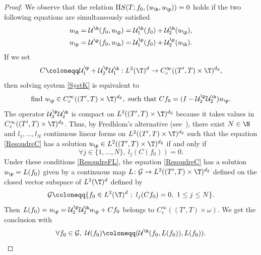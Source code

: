 \Changel
\begin{proof}

We observe that the relation $\Pi S(T;f_0, (u_{\h},u_{\p})) = 0$ holds
if the two following equations are simultaneously satisfied
\begin{equation}
\begin{split}
\label{SystK}
u_{\h} & = \mathcal U^\h(f_0, u_{\p}) = \mathcal U^\h_{1}(f_0) + \mathcal U^\h_{2}(u_{\p}),\\
u_{\p} & = \mathcal U^\p(f_0, u_{\h}) = \mathcal U^\p_{1}(f_0) + \mathcal U^\p_{2}(u_{\h}).
\end{split}
\end{equation}
If we set
\begin{equation*}
C\coloneqq \mathcal U^\p_{1} + \mathcal U^\p_{2} \mathcal U^\h_{1} : L^2(\T)^{d} \to C^\infty_c((T',T)\times\T)^{d_2},
\end{equation*}
then solving system \eqref{SystK} is equivalent to
\begin{equation}
\label{ResoudreC}
\text{find}\ u_{\p} \in C^\infty_c((T',T)\times\T)^{d_2},\ \text{such}\ \text{that}\ Cf_0 = (I-\mathcal U^\p_{2}\mathcal U^\h_{2})u_{\p}.
\end{equation}
The operator $\mathcal U^\p_{2}\mathcal U^\h_{2}$ is compact on $L^2((T',T)\times\T)^{d_2}$ because it takes values in $C^\infty_c((T',T)\times \T)^{d_2}$. Thus, by Fredhlom's alternative (see~\cite[Th.\,6.6]{brezis_2011}), there exist $N \in \N$ and $l_1, \dots, l_N$ continuous linear forms on $L^2((T',T)\times\T)^{d_2}$ such that the equation \eqref{ResoudreC} has a solution $u_{\p} \in L^2((T',T)\times\T)^{d_2}$ if and only if
\begin{equation}
\label{ResoudreFL}
\forall j \in \{1, \dots, N\},\ l_j(C(f_0)) = 0.
\end{equation}
Under these conditions \eqref{ResoudreFL}, the equation \eqref{ResoudreC} has a solution $u_{\p} = L(f_0)$ given by a continuous map $L\colon\mathcal{G} \to L^2((T',T)\times\T)^{d_2}$ defined on the closed vector subspace of $L^2(\T)^d$ defined by
\begin{equation}
\mathcal{G} \coloneqq \{ f_0\in L^2(\T)^d\ ;\ l_j(Cf_0) = 0,\ 1\leq j \leq N\}.
\label{defmathcalW}
\end{equation}
Then $L(f_0)=u_{\p} = \mathcal{U}_2^{\p}\mathcal{U}_2^{\h} u_{\p} + C f_0$ belongs to $C^\infty_c((T',T)\times\omega)$.
We get the conclusion with
\[
\forall f_0 \in \mathcal{G},\ \mathcal{U}(f_0) \coloneqq (\mathcal{U}^{\h}(f_0, L(f_0)),L(f_0)).\qedhere
\]
\end{proof}
\Changelback


